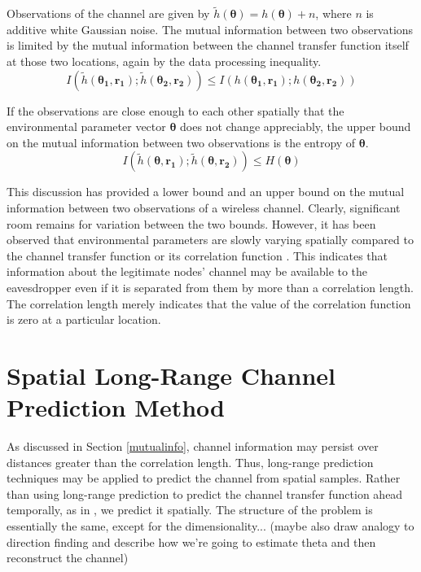 \documentclass{allertonproc}
\begin{document}
Observations of the channel are given by $\tilde{h}(\boldsymbol{\theta})=h(\boldsymbol{\theta})+n$, where $n$ is additive white Gaussian noise.  The mutual information between two observations is limited by the mutual information between the channel transfer function itself at those two locations, again by the data processing inequality.
\begin{equation}
I(\tilde{h}(\boldsymbol{\theta_1},\mathbf{r_1}); \tilde{h}(\boldsymbol{\theta_2},\mathbf{r_2}))\leq I(h(\boldsymbol{\theta_1},\mathbf{r_1}); h(\boldsymbol{\theta_2},\mathbf{r_2}))
\end{equation}

If the observations are close enough to each other spatially that the environmental parameter vector $\boldsymbol{\theta}$ does not change appreciably, the upper bound on the mutual information between two observations is the entropy of $\boldsymbol{\theta}$.
\begin{equation}
I(\tilde{h}(\boldsymbol{\theta},\mathbf{r_1}); \tilde{h}(\boldsymbol{\theta},\mathbf{r_2}))\leq H(\boldsymbol{\theta})
\end{equation}

This discussion has provided a lower bound and an upper bound on the mutual information between two observations of a wireless channel.  Clearly, significant room remains for variation between the two bounds.  However, it has been observed that environmental parameters are slowly varying spatially compared to the channel transfer function or its correlation function \cite{jakes1974, duel-hallen2007}.  This indicates that information about the legitimate nodes' channel may be available to the eavesdropper even if it is separated from them by more than a correlation length.   The correlation length merely indicates that the value of the correlation function is zero at a particular location.  

\section{Spatial Long-Range Channel Prediction Method}\label{prediction}
As discussed in Section \ref{mutualinfo}, channel information may persist over distances greater than the correlation length. Thus, long-range prediction techniques \cite{a long range prediction paper} may be applied to predict the channel from spatial samples. Rather than using long-range prediction to predict the channel transfer function ahead temporally, as in \cite{duel-hallen2007}, we predict it spatially.  The structure of the problem is essentially the same, except for the dimensionality... (maybe also draw analogy to direction finding and describe how we're going to estimate theta and then reconstruct the channel)
\end{document}

